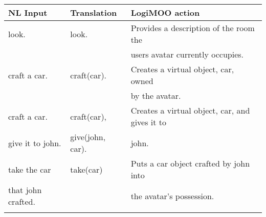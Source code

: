 {\newpage
\clearpage
\samepage \begin{table}[htbp]
\begin{tabular}{|l|l|l|} \hline
{\bf NL Input} & {\bf Translation} & {\bf LogiMOO action} \\ 
\hline \hline
look. & look. & Provides a description of the room the\\ 
      &       & users avatar currently occupies. \\  \hline

craft a car. & craft(car). & Creates a virtual object, car, owned \\ 
             &             & by the avatar. \\  \hline

craft a car. & craft(car), & Creates a virtual object, car, and gives it to\\  
give it to john. & give(john, car). & john. \\  \hline

take the car      & take(car)      & Puts a car object crafted by john into \\ 
that john crafted. &  			 & the avatar's possession. \\ 
                   & 		    & \\  \hline
\end{tabular} \\ 

\end{table}
}



